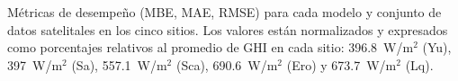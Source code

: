 \documentclass[letterpaper,12pt, twoside]{report}
\providecommand{\DIFdeltex}[1]{{\protect\color{red} \scriptsize #1}} %
\providecommand{\DIFdelFL}[1]{\DIFdel{#1}} %
\providecommand{\DIFdel}[1]{\texorpdfstring{\DIFdeltex{#1}}{}} %
\begin{document}
{%
\DIFdelFL{Métricas de desempeño (MBE, MAE, RMSE) para cada modelo y conjunto de datos satelitales en los cinco sitios. 
           Los valores están normalizados y expresados como porcentajes relativos al promedio de GHI en cada sitio: 
           396.8~W/m$^{2}$ (Yu), 397~W/m$^{2}$ (Sa), 557.1~W/m$^{2}$ (Sca), 690.6~W/m$^{2}$ (Ero) y 673.7~W/m$^{2}$ (Lq).}}
\end{document}
